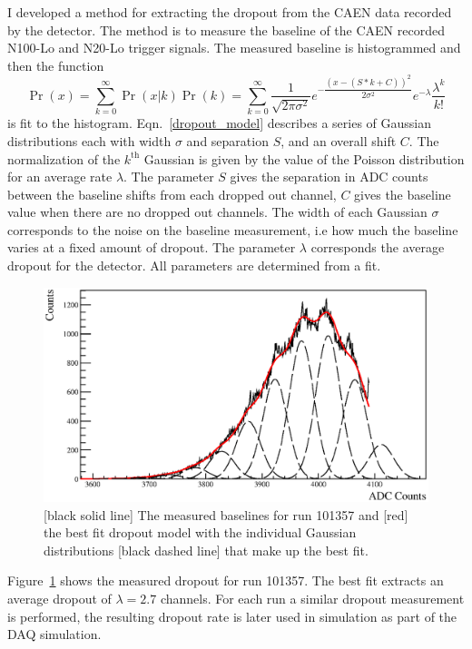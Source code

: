 I developed a method for extracting the dropout from the CAEN data
recorded by the detector.
The method is to measure the baseline of the CAEN recorded N100-Lo and N20-Lo
trigger signals.
The measured baseline is histogrammed and then the function
\begin{equation}
    \Pr(x) = \sum_{k=0}^{\infty}\Pr(x | k)\Pr(k) = \sum_{k=0}^{\infty} \dfrac{1}{\sqrt{2 \pi \sigma^2}} e^{-\dfrac{(x - (S*k + C))^2}{2 \sigma^2}} e^{-\lambda}\dfrac{\lambda^{k}}{k!}
    \label{dropout_model}
\end{equation}
is fit to the histogram. Eqn.~\ref{dropout_model} describes a series of Gaussian
distributions each with width $\sigma$ and separation $S$, and an overall shift $C$.
The normalization of the $k^{\text{th}}$ Gaussian is given by the value of the Poisson
distribution for an average rate $\lambda$.
The parameter $S$ gives the separation in ADC counts
between the baseline shifts from each dropped out channel, $C$ gives the baseline
value when there are no dropped out channels.
The width of each Gaussian $\sigma$ corresponds to the noise on the baseline
measurement, i.e how much the baseline varies at a fixed amount of dropout.
The parameter $\lambda$ corresponds the average dropout for the detector.
All parameters are determined from a fit.

\begin{figure}[htbp]
    \centering
    \includegraphics[width=1\textwidth]{dropout_example}
    \caption[Dropout Fit Example]{[black solid line] The measured baselines
    for run 101357 and [red] the best fit dropout model with the
    individual Gaussian distributions [black dashed line] that make up the best fit.}
\label{fig:dropoutexample}
\end{figure}


Figure~\ref{fig:dropoutexample} shows the measured dropout for run 101357.
The best fit extracts an average dropout of $\lambda=2.7$ channels.
For each run a similar dropout measurement is performed, the resulting dropout
rate is later used in simulation as part of the DAQ simulation.

